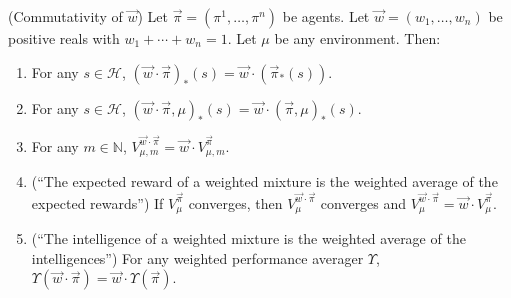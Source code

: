 \documentclass[runningheads]{llncs}
\begin{document}
\begin{theorem}
\label{maintheorem}
    (Commutativity of $\vec w$)
    Let $\vec\pi=(\pi^1,\ldots,\pi^n)$ be agents.
    Let $\vec w=(w_1,\ldots,w_n)$ be positive reals with
    $w_1+\cdots+w_n=1$. Let $\mu$ be any environment.
    Then:
    \begin{enumerate}
        \item
        For any $s\in\mathcal H$,
        $(\vec w\cdot\vec\pi)_*(s)=\vec w\cdot(\vec\pi_*(s))$.
        \item
        For any $s\in\mathcal H$,
        $(\vec w\cdot \vec\pi,\mu)_*(s)=\vec w\cdot(\vec\pi,\mu)_*(s)$.
        \item
        For any $m\in\mathbb N$,
        $V^{\vec w\cdot \vec\pi}_{\mu,m}=\vec w\cdot V^{\vec\pi}_{\mu,m}$.
        \item
        (``The expected reward of a weighted mixture is the weighted
        average of the expected rewards'')
        If $V^{\vec\pi}_\mu$ converges, then $V^{\vec w\cdot\vec\pi}_\mu$
        converges and $V^{\vec w\cdot\vec\pi}_\mu=\vec w\cdot V^{\vec\pi}_\mu$.
        \item
        (``The intelligence of a weighted mixture is the weighted average
        of the intelligences'')
        For any weighted performance averager $\Upsilon$,
        $\Upsilon(\vec w\cdot\vec\pi)=\vec w\cdot\Upsilon(\vec\pi)$.
    \end{enumerate}
\end{theorem}
\end{document}

